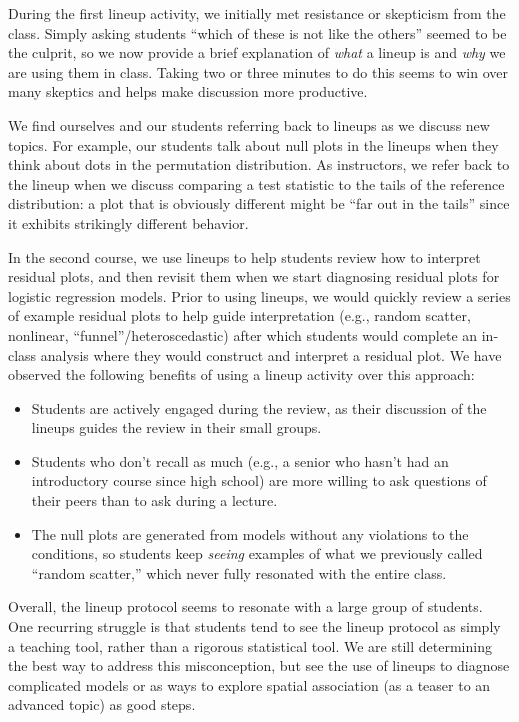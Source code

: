 \documentclass[12pt]{article}
\providecommand{\tightlist}{%
  \setlength{\itemsep}{0pt}\setlength{\parskip}{0pt}}
\begin{document}
During the first lineup activity, we initially met resistance or
skepticism from the class. Simply asking students ``which of these is
not like the others'' seemed to be the culprit, so we now provide a
brief explanation of \emph{what} a lineup is and \emph{why} we are using
them in class. Taking two or three minutes to do this seems to win over
many skeptics and helps make discussion more productive.

We find ourselves and our students referring back to lineups as we
discuss new topics. For example, our students talk about null plots in
the lineups when they think about dots in the permutation distribution.
As instructors, we refer back to the lineup when we discuss comparing a
test statistic to the tails of the reference distribution: a plot that
is obviously different might be ``far out in the tails'' since it
exhibits strikingly different behavior.

In the second course, we use lineups to help students review how to
interpret residual plots, and then revisit them when we start diagnosing
residual plots for logistic regression models. Prior to using lineups,
we would quickly review a series of example residual plots to help guide
interpretation (e.g., random scatter, nonlinear,
``funnel''/heteroscedastic) after which students would complete an
in-class analysis where they would construct and interpret a residual
plot. We have observed the following benefits of using a lineup activity
over this approach:

\begin{itemize}
\tightlist
\item
  Students are actively engaged during the review, as their discussion
  of the lineups guides the review in their small groups.
\item
  Students who don't recall as much (e.g., a senior who hasn't had an
  introductory course since high school) are more willing to ask
  questions of their peers than to ask during a lecture.
\item
  The null plots are generated from models without any violations to the
  conditions, so students keep \emph{seeing} examples of what we
  previously called ``random scatter,'' which never fully resonated with
  the entire class.
\end{itemize}

Overall, the lineup protocol seems to resonate with a large group of
students. One recurring struggle is that students tend to see the lineup
protocol as simply a teaching tool, rather than a rigorous statistical
tool. We are still determining the best way to address this
misconception, but see the use of lineups to diagnose complicated models
or as ways to explore spatial association (as a teaser to an advanced
topic) as good steps.
\end{document}
